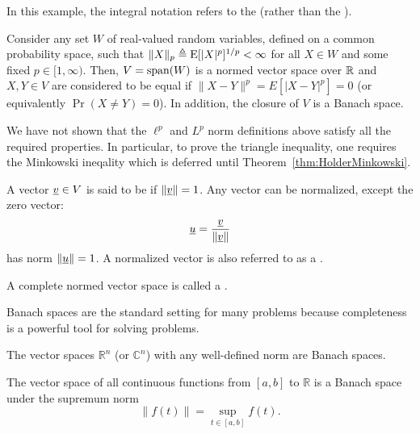 In this example, the integral notation refers to the  (rather than the ).


\begin{example}
Consider any set $W$ of real-valued random variables, defined on a common probability space, such that $\| X \|_p \triangleq \mathrm{E} [|X|^p]^{1/p} < \infty$ for all $X\in W$ and some fixed $p\in [1,\infty)$.
Then, $V = \mathrm{span} (W)$ is a normed vector space over $\mathbb{R}$ and $X,Y\in V$ are considered to be equal if $\| X-Y \|^p = E \left[ |X-Y|^p \right] = 0$ (or equivalently $\Pr (X \neq Y ) = 0$).
In addition, the closure of $V$ is a Banach space.
\end{example}

\begin{remark}
We have not shown that the $\ell^p$ and $L^p$ norm definitions above satisfy all the required properties.
In particular, to prove the triangle inequality, one requires the Minkowski ineqality which is deferred until Theorem~\ref{thm:HolderMinkowski}.
\end{remark}

\begin{definition}
A vector $\underline{v} \in V$ is said to be  if $\left\| \underline{v} \right\| = 1$.
Any vector can be normalized, except the zero vector:
\begin{equation}
\underline{u} = \frac{\underline{v}}{\left\| \underline{v} \right\|}
\end{equation}
has norm $\left\| \underline{u} \right\| = 1$.
A normalized vector is also referred to as a .
\end{definition}

\begin{definition}
A complete normed vector space is called a .
\end{definition}

Banach spaces are the standard setting for many problems because completeness is a powerful tool for solving problems.

\begin{example}
The vector spaces $\mathbb{R}^n$ (or $\mathbb{C}^n$) with any well-defined norm are Banach spaces.
\end{example}

\begin{example}
The vector space of all continuous functions from $[a,b]$ to $\mathbb{R}$ is a Banach space under the supremum norm
\[ \left\| f(t) \right\| = \sup_{t\in [a,b]} f(t). \]
\end{example}

